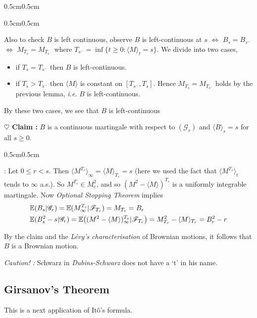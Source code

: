 \documentclass[12pt,a4paper]{article}
\newenvironment{proof}
{\begin{changemargin}{0.5cm}{0.5cm} 
	}%
	{\end{changemargin}
}
\newenvironment{subproof}
{\begin{changemargin}{0.5cm}{0.5cm} 
	}%
	{\end{changemargin}
}
\renewenvironment{i}
{\begin{itemize} 
	}%
	{\end{itemize}
}
\newenvironment{p}
{\begin{proof} 
	}%
	{\end{proof}
}
\begin{document}
\begin{p}
\begin{subproof}
Also to check $B$ is left continuous, observe $B$ is left-continuous at $s$ $\Leftrightarrow$ $B_s = B_{s^-}$ $\Leftrightarrow$ $M_{T_s} = M_{T_{s^-}}$ where $T_{s^-} = \inf \{t\geq 0 : \langle M \rangle_t =s \}$. We divide into two cases,
\begin{i}
\item if $T_s = T_{s^-}$ then $B$ is left-continuous.
\item if $T_s > T_{s^-}$ then $\langle M \rangle$ is constant on $[T_{s^-}, T_s]$. Hence $M_{T_s} = M_{T_{s^-}}$ holds by the previous lemma, \textit{i.e.} $B$ is left-continuous.
\end{i}
By these two cases, we see that $B$ is left-continuous
\end{subproof}
\textbf{$\heartsuit$ Claim :} $B$ is a continuous martingale with respect to $(\mathscr{G}_s)$ and $\langle B \rangle_s = s$ for all $s\geq 0$.
\begin{subproof}
: Let $0\leq r <s$. Then $\langle M^{T_s} \rangle_{\infty} = \langle M \rangle_{T_s} = s$ (here we used the fact that $\langle M^{T_s} \rangle_t$ tends to $\infty$ a.s.). So $M^{T_s} \in M_c^2$, and so $(M^2 - \langle M \rangle)^{T_s}$ is a uniformly integrable martingale. Now \emph{Optional Stopping Theorem} implies
\begin{align*}
& \mathbb{E} (B_s | \mathscr{G}_r) = \mathbb{E} (M_{\infty}^{T_s} | \mathscr{F}_{T_r} ) = M_{T_r} = B_r \\
& \mathbb{E} (B_s^2 - s | \mathscr{G}_r) = \mathbb{E} \big( (M^2 - \langle M \rangle)^{T_s}_{\infty} | \mathscr{F}_{T_r}\big) = M^2_{T_r} - \langle M \rangle_{T_r} = B_r^2 -r 
\end{align*}
\end{subproof}
By the claim and the \emph{L\'evy's characterisation} of Brownian motions, it follows that $B$ is a Brownian motion.

\eop
\end{p}
\s

\emph{Caution! :} Schwarz in \emph{Dubins-Schwarz} does not have a `t' in his name.

\subsection{Girsanov's Theorem}

This is a next application of It\^o's formula.
\s
\end{document}
